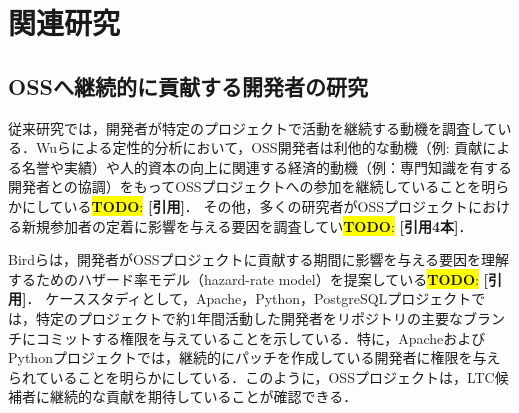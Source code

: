 \documentclass[submit,techrep,noauthor]{ipsj}
\newcommand{\todo}[1]{\colorbox{yellow}{{\bf TODO}:}{\color{red} {\textbf{[#1]}}}}
\begin{document}
\section{関連研究}\label{sec:related}

\subsection{OSSへ継続的に貢献する開発者の研究}

従来研究では，開発者が特定のプロジェクトで活動を継続する動機を調査している．Wuらによる定性的分析において，OSS開発者は利他的な動機（例: 貢献による名誉や実績）や人的資本の向上に関連する経済的動機（例：専門知識を有する開発者との協調）をもってOSSプロジェクトへの参加を継続していることを明らかにしている\todo{引用}．
その他，多くの研究者がOSSプロジェクトにおける新規参加者の定着に影響を与える要因を調査してい\todo{引用4本}．

Birdらは，開発者がOSSプロジェクトに貢献する期間に影響を与える要因を理解するためのハザード率モデル（hazard-rate model）を提案している\todo{引用}．
ケーススタディとして，Apache，Python，PostgreSQLプロジェクトでは，特定のプロジェクトで約1年間活動した開発者をリポジトリの主要なブランチにコミットする権限を与えていることを示している．特に，ApacheおよびPythonプロジェクトでは，継続的にパッチを作成している開発者に権限を与えられていることを明らかにしている．このように，OSSプロジェクトは，LTC候補者に継続的な貢献を期待していることが確認できる．
\end{document}
